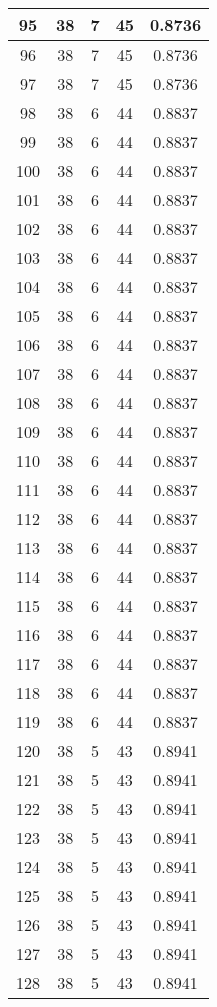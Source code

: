 \documentclass[letterpaper, 12pt]{article}
\begin{document}
\begin{longtable}{|c|c|c|c|c|}
95 & 38 & 7 & 45 & 0.8736 \\
\hline
96 & 38 & 7 & 45 & 0.8736 \\
\hline
97 & 38 & 7 & 45 & 0.8736 \\
\hline
98 & 38 & 6 & 44 & 0.8837 \\
\hline
99 & 38 & 6 & 44 & 0.8837 \\
\hline
100 & 38 & 6 & 44 & 0.8837 \\
\hline
101 & 38 & 6 & 44 & 0.8837 \\
\hline
102 & 38 & 6 & 44 & 0.8837 \\
\hline
103 & 38 & 6 & 44 & 0.8837 \\
\hline
104 & 38 & 6 & 44 & 0.8837 \\
\hline
105 & 38 & 6 & 44 & 0.8837 \\
\hline
106 & 38 & 6 & 44 & 0.8837 \\
\hline
107 & 38 & 6 & 44 & 0.8837 \\
\hline
108 & 38 & 6 & 44 & 0.8837 \\
\hline
109 & 38 & 6 & 44 & 0.8837 \\
\hline
110 & 38 & 6 & 44 & 0.8837 \\
\hline
111 & 38 & 6 & 44 & 0.8837 \\
\hline
112 & 38 & 6 & 44 & 0.8837 \\
\hline
113 & 38 & 6 & 44 & 0.8837 \\
\hline
114 & 38 & 6 & 44 & 0.8837 \\
\hline
115 & 38 & 6 & 44 & 0.8837 \\
\hline
116 & 38 & 6 & 44 & 0.8837 \\
\hline
117 & 38 & 6 & 44 & 0.8837 \\
\hline
118 & 38 & 6 & 44 & 0.8837 \\
\hline
119 & 38 & 6 & 44 & 0.8837 \\
\hline
120 & 38 & 5 & 43 & 0.8941 \\
\hline
121 & 38 & 5 & 43 & 0.8941 \\
\hline
122 & 38 & 5 & 43 & 0.8941 \\
\hline
123 & 38 & 5 & 43 & 0.8941 \\
\hline
124 & 38 & 5 & 43 & 0.8941 \\
\hline
125 & 38 & 5 & 43 & 0.8941 \\
\hline
126 & 38 & 5 & 43 & 0.8941 \\
\hline
127 & 38 & 5 & 43 & 0.8941 \\
\hline
128 & 38 & 5 & 43 & 0.8941 \\

\end{longtable}
\end{document}
